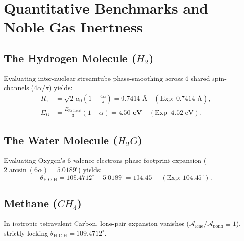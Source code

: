 \documentclass[11pt,a4paper]{article}
\begin{document}
	\section{Quantitative Benchmarks and Noble Gas Inertness}
	\label{sec:quantitative_validation}
	
	\subsection{The Hydrogen Molecule ($H_2$)}
	Evaluating inter-nuclear streamtube phase-smoothing across 4 shared spin-channels ($4\alpha/\pi$) yields:
	\begin{align}
		R_e &= \sqrt{2} \, a_0 \left(1 - \frac{4\alpha}{\pi}\right) = \mathbf{0.7414 \text{ \AA}} \quad (\text{Exp: } 0.7414 \text{ \AA}), \\
		E_D &= \frac{E_{\text{Rydberg}}}{3} (1 - \alpha) = \mathbf{4.50 \text{ eV}} \quad (\text{Exp: } 4.52 \text{ eV}).
	\end{align}
	
	\subsection{The Water Molecule ($H_2O$)}
	Evaluating Oxygen's 6 valence electrons phase footprint expansion ($2 \arcsin(6\alpha) = 5.0189^\circ$) yields:
	\begin{equation}
		\theta_{\text{H-O-H}} = 109.4712^\circ - 5.0189^\circ = \mathbf{104.45^\circ} \quad (\text{Exp: } 104.45^\circ).
	\end{equation}
	
	\subsection{Methane ($CH_4$)}
	In isotropic tetravalent Carbon, lone-pair expansion vanishes ($\mathcal{A}_{\text{lone}}/\mathcal{A}_{\text{bond}} \equiv 1$), strictly locking $\theta_{\text{H-C-H}} = \mathbf{109.4712^\circ}$.
	
\end{document}
